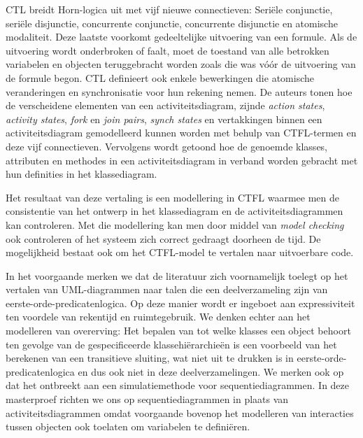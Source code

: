 CTL breidt Horn-logica uit met vijf nieuwe connectieven: Seri\"ele conjunctie, seri\"ele disjunctie, concurrente conjunctie, concurrente disjunctie en atomische modaliteit. Deze laatste voorkomt gedeeltelijke uitvoering van een formule. Als de uitvoering wordt onderbroken of faalt, moet de toestand van alle betrokken variabelen en objecten teruggebracht worden zoals die was v\'o\'or de uitvoering van de formule begon. CTL definieert ook enkele bewerkingen die atomische veranderingen en synchronisatie voor hun rekening nemen. De auteurs tonen hoe de verscheidene elementen van een activiteitsdiagram, zijnde \textit{action states}, \textit{activity states}, \textit{fork} en \textit{join pairs}, \textit{synch states} en vertakkingen binnen een activiteitsdiagram gemodelleerd kunnen worden met behulp van CTFL-termen en deze vijf connectieven. Vervolgens wordt getoond hoe de genoemde klasses, attributen en methodes in een activiteitsdiagram in verband worden gebracht met hun definities in het klassediagram.

Het resultaat van deze vertaling is een modellering in CTFL waarmee men de consistentie van het ontwerp in het klassediagram en de activiteitsdiagrammen kan controleren. Met die modellering kan men door middel van \textit{model checking} ook controleren of het systeem zich correct gedraagt doorheen de tijd. De mogelijkheid bestaat ook om het CTFL-model te vertalen naar uitvoerbare code.

\parbreak

In het voorgaande merken we dat de literatuur zich voornamelijk toelegt op het vertalen van UML-diagrammen naar talen die een deelverzameling zijn van eerste-orde-predicatenlogica. Op deze manier wordt er ingeboet aan expressiviteit ten voordele van rekentijd en ruimtegebruik. We denken echter aan het modelleren van overerving: Het bepalen van tot welke klasses een object behoort ten gevolge van de gespecificeerde klassehi\"erarchie\"en is een voorbeeld van het berekenen van een transitieve sluiting, wat niet uit te drukken is in eerste-orde-predicatenlogica en dus ook niet in deze deelverzamelingen. We merken ook op dat het ontbreekt aan een simulatiemethode voor sequentiediagrammen. In deze masterproef richten we ons op sequentiediagrammen in plaats van activiteitsdiagrammen omdat voorgaande bovenop het modelleren van interacties tussen objecten ook toelaten om variabelen te defini\"eren.